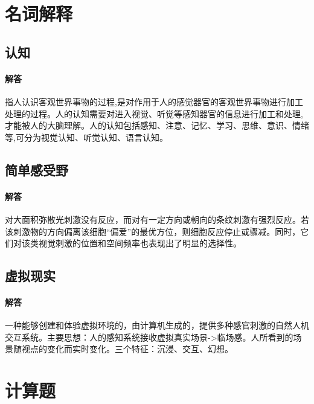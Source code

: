 \documentclass[UTF8]{ctexart}
\begin{document}
\section{名词解释}
\subsection{认知}
\paragraph{解答}
指人认识客观世界事物的过程,是对作用于人的感觉器官的客观世界事物进行加工处理的过程。人的认知需要对进入视觉、听觉等感知器官的信息进行加工和处理,才能被人的大脑理解。人的认知包括感知、注意、记忆、学习、思维、意识、情绪等,可分为视觉认知、听觉认知、语言认知。
\subsection{简单感受野}
\paragraph{解答}
对大面积弥散光刺激没有反应，而对有一定方向或朝向的条纹刺激有强烈反应。若该刺激物的方向偏离该细胞“偏爱”的最优方位，则细胞反应停止或骤减。同时，它们对该类视觉刺激的位置和空间频率也表现出了明显的选择性。
\subsection{虚拟现实}
\paragraph{解答}
一种能够创建和体验虚拟环境的，由计算机生成的，提供多种感官刺激的自然人机交互系统。主要思想：人的感知系统接收虚拟真实场景->临场感。人所看到的场景随视点的变化而实时变化。三个特征：沉浸、交互、幻想。
\section{计算题}
\subsection{}
\end{document}
